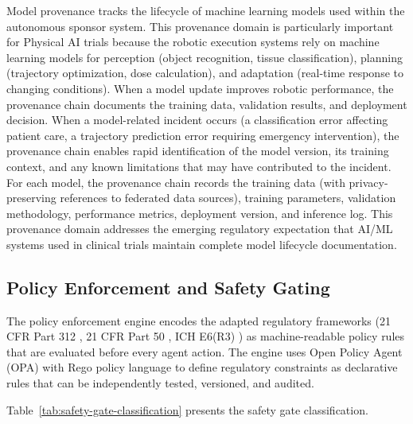 Model provenance tracks the lifecycle of machine learning models used within the autonomous
sponsor system. This provenance domain is particularly important for Physical AI trials
because the robotic execution systems rely on machine learning models for perception (object
recognition, tissue classification), planning (trajectory optimization, dose calculation),
and adaptation (real-time response to changing conditions). When a model update improves
robotic performance, the provenance chain documents the training data, validation results,
and deployment decision. When a model-related incident occurs (a classification error
affecting patient care, a trajectory prediction error requiring emergency intervention),
the provenance chain enables rapid identification of the model version, its training
context, and any known limitations that may have contributed to the incident. For each model, the provenance chain records the training data (with
privacy-preserving references to federated data sources), training parameters, validation
methodology, performance metrics, deployment version, and inference log. This provenance
domain addresses the emerging regulatory expectation that AI/ML systems used in clinical
trials maintain complete model lifecycle documentation.

\subsection{Policy Enforcement and Safety Gating}

The policy enforcement engine encodes the adapted regulatory frameworks (21 CFR Part 312
\cite{cfr312-adapt}, 21 CFR Part 50 \cite{cfr50-adapt}, ICH E6(R3) \cite{ich-adapt}) as
machine-readable policy rules that are evaluated before every agent action. The engine uses
Open Policy Agent (OPA) with Rego policy language to define regulatory constraints as
declarative rules that can be independently tested, versioned, and audited.

Table~\ref{tab:safety-gate-classification} presents the safety gate classification.

